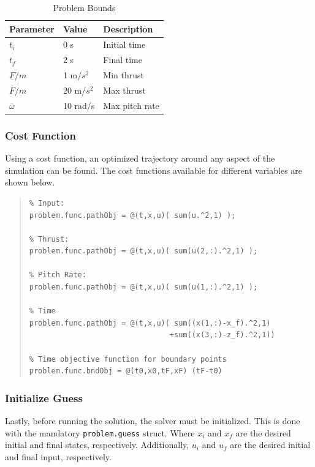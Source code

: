 \documentclass[12pt]{article}
\begin{document}
\begin{table}[H]
\begin{center}
\begin{tabular}{ |p{2.5cm}||p{2cm}||p{3cm}| }

 \hline
 Parameter & Value & Description\\
 \hline
 $t_{i}$   & 0 s  & Initial time\\
 $t_{f}$  & 2 s  & Final time\\
 $\underline{F}/m$ & 1 m/$s^{2}$ & Min thrust\\
 $\overline{F}/m$ & 20 m/$s^{2}$ & Max thrust\\
 $\overline{\omega}$ & 10 rad/s & Max pitch rate \\
 \hline
\end{tabular}
\caption{Problem Bounds }
\label{Problem Bounds}
\end{center}
\end{table}

\clearpage

\subsubsection{Cost Function}
Using a cost function, an optimized trajectory around any aspect of the simulation can be found. The cost functions available for different variables are shown below. 
\begin{quote}
\begin{lstlisting}
% Input:
problem.func.pathObj = @(t,x,u)( sum(u.^2,1) );

% Thrust:
problem.func.pathObj = @(t,x,u)( sum(u(2,:).^2,1) );

% Pitch Rate:
problem.func.pathObj = @(t,x,u)( sum(u(1,:).^2,1) );

% Time
problem.func.pathObj = @(t,x,u)( sum((x(1,:)-x_f).^2,1) 
                                +sum((x(3,:)-z_f).^2,1))

% Time objective function for boundary points
problem.func.bndObj = @(t0,x0,tF,xF) (tF-t0)

\end{lstlisting}
\end{quote}

\subsubsection{Initialize Guess}
Lastly, before running the solution, the solver must be initialized. This is done with the mandatory \lstinline!problem.guess! struct. Where $x_{i}$ and $x_{f}$ are the desired initial and final states, respectively. Additionally, $u_{i}$ and $u_{f}$ are the desired initial and final input, respectively. 
\end{document}
